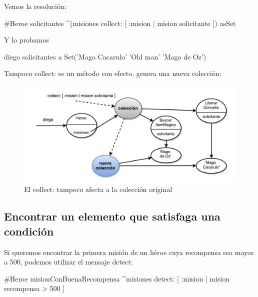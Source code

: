 \documentclass[a4paper,12pt]{book}
\begin{document}
Vemos la resolución:

\begin{code}
#Heroe
solicitantes
   ^(misiones collect: [ :mision | mision solicitante ]) asSet
\end{code}

\vspace{\baselineskip}
Y lo probamos 

\begin{code}
diego solicitantes
   a Set('Mago Cacarulo' 'Old man' 'Mago de Oz')
\end{code}

Tampoco collect: es un método con efecto, genera una nueva colección:

\begin{figure}[h!]
    \centering
    \includegraphics[width=1.1\textwidth]{images/21_Collect_sin_efecto.pdf}
    \caption{El collect: tampoco afecta a la colección original}
\end{figure}

\subsection{Encontrar un elemento que satisfaga una condición}
Si queremos encontrar la primera misión de un héroe cuya recompensa sea mayor a 500, 
podemos utilizar el mensaje detect:

\begin{code}
#Heroe
misionConBuenaRecompensa
    ^misiones detect: [ :mision | mision recompensa > 500 ]
\end{code}
\end{document}
